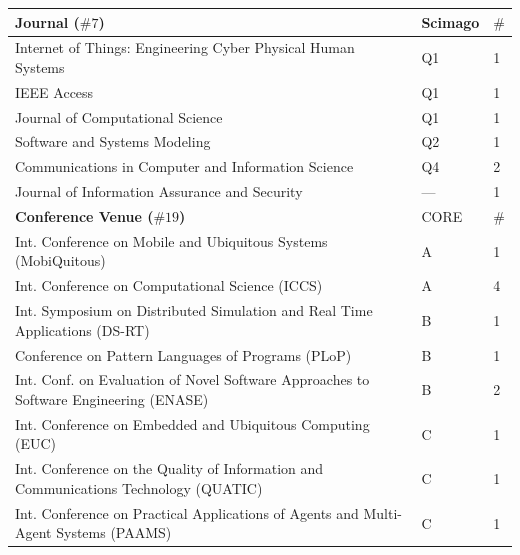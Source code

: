 \documentclass[10pt, a4paper]{article}
\begin{document}
\begin{table}[!ht]
    \centering
    \footnotesize
    
    \begin{tabular}{@{}p{11.5cm}ll@{}}
        \toprule
        \textbf{Journal ($\#7$)}                                                              & Scimago & $\#$ \\ \midrule
        Internet of Things: Engineering Cyber Physical Human Systems                          & Q1      & 1    \\
        IEEE Access                                                                           & Q1      & 1    \\
        Journal of Computational Science                                                      & Q1      & 1    \\
        Software and Systems Modeling                                                         & Q2      & 1    \\
        Communications in Computer and Information Science                                    & Q4      & 2    \\
        Journal of Information Assurance and Security                                         & ---     & 1    \\ \midrule
        \textbf{Conference Venue ($\#19$)}                                                    & CORE    & $\#$ \\ \midrule
        Int. Conference on Mobile and Ubiquitous Systems (MobiQuitous)                        & A       & 1    \\
        Int. Conference on Computational Science (ICCS)                                       & A       & 4    \\
        Int. Symposium on Distributed Simulation and Real Time Applications (DS-RT)           & B       & 1    \\
        Conference on Pattern Languages of Programs (PLoP)                                    & B       & 1    \\
        Int. Conf. on Evaluation of Novel Software Approaches to Software Engineering (ENASE) & B       & 2    \\
        Int. Conference on Embedded and Ubiquitous Computing (EUC)                            & C       & 1    \\
        Int. Conference on the Quality of Information and Communications Technology (QUATIC)  & C       & 1    \\
        Int. Conference on Practical Applications of Agents and Multi-Agent Systems (PAAMS)   & C       & 1    \\

\end{tabular}
\end{table}
\end{document}
